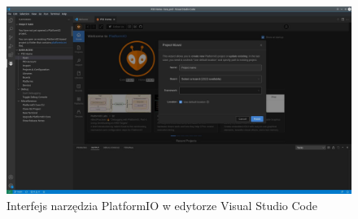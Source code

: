 \begin{figure}[b!]
    \begin{center}
        \includegraphics[width=15cm]{pic/pio.jpg}
    \end{center}
    \caption{Interfejs narzędzia PlatformIO w edytorze Visual Studio Code}\label{rys:pio}
\end{figure}
